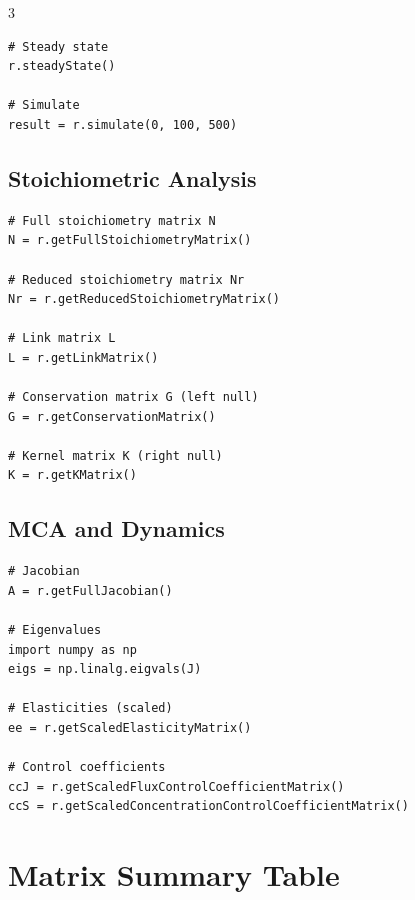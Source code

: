 \documentclass[10pt,landscape,letter]{article}
\begin{document}
\begin{multicols}{3}
\begin{Verbatim}[fontsize=\scriptsize]
# Steady state
r.steadyState()

# Simulate
result = r.simulate(0, 100, 500)
\end{Verbatim}

\subsection{Stoichiometric Analysis}
\begin{Verbatim}[fontsize=\scriptsize]
# Full stoichiometry matrix N
N = r.getFullStoichiometryMatrix()

# Reduced stoichiometry matrix Nr
Nr = r.getReducedStoichiometryMatrix()

# Link matrix L
L = r.getLinkMatrix()

# Conservation matrix G (left null)
G = r.getConservationMatrix()

# Kernel matrix K (right null)
K = r.getKMatrix()
\end{Verbatim}

\subsection{MCA and Dynamics}
\begin{Verbatim}[fontsize=\scriptsize]
# Jacobian
A = r.getFullJacobian()

# Eigenvalues
import numpy as np
eigs = np.linalg.eigvals(J)

# Elasticities (scaled)
ee = r.getScaledElasticityMatrix()

# Control coefficients
ccJ = r.getScaledFluxControlCoefficientMatrix()
ccS = r.getScaledConcentrationControlCoefficientMatrix()
\end{Verbatim}

\section{Matrix Summary Table}


\end{multicols}
\end{document}
